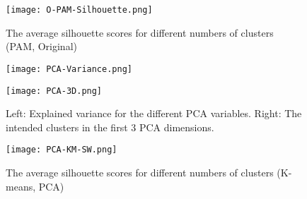 \documentclass[11pt,twoside,swedish]{article}
\begin{document}
\begin{figure}
\centering
\texttt{[image: O-PAM-Silhouette.png]}
\caption{The average silhouette scores for different numbers of
  clusters (PAM, Original)}
\end{figure}

\begin{table}[ht]
\centering
{}
\caption{The result of PAM clustering on the original data.}
\end{table}

\begin{figure}
\centering
\begin{minipage}{0.45\textwidth}
\texttt{[image: PCA-Variance.png]}
\end{minipage}
\begin{minipage}{0.45\textwidth}
\texttt{[image: PCA-3D.png]}
\end{minipage}
\label{mini 4 pca}
\caption{Left: Explained variance for the different PCA
  variables. Right: The intended clusters in the first 3 PCA dimensions.}
\end{figure}

\begin{figure}
\centering
\texttt{[image: PCA-KM-SW.png]}
\caption{The average silhouette scores for different numbers of
  clusters (K-means, PCA)}
\end{figure}

\begin{table}[ht]
\centering
{}
\caption{The result of k-means clustering on the PCA data.}
\end{table}
\end{document}
